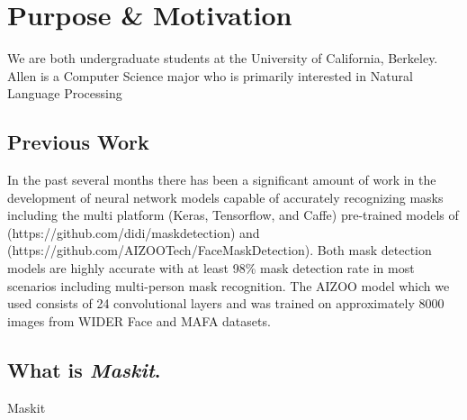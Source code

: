 \documentclass[conference, 12pt, onecolumn]{IEEEtran}
\begin{document}
\section{Purpose \& Motivation}
We are both undergraduate students at the University of California, Berkeley. Allen is a Computer Science major who is primarily interested in Natural Language Processing
\subsection{Previous Work}
In the past several months there has been a significant amount of work in the development of neural network models capable of accurately recognizing masks including the multi platform (Keras, Tensorflow, and Caffe) pre-trained models of  (https://github.com/didi/maskdetection) and (https://github.com/AIZOOTech/FaceMaskDetection). Both mask detection models are highly accurate with at least 98\% mask detection rate in most scenarios including multi-person mask recognition. The AIZOO model which we used consists of 24 convolutional layers and was trained on approximately 8000 images from WIDER Face and MAFA datasets. 



\subsection{What is \textit{Maskit}.}
Maskit 
\end{document}

